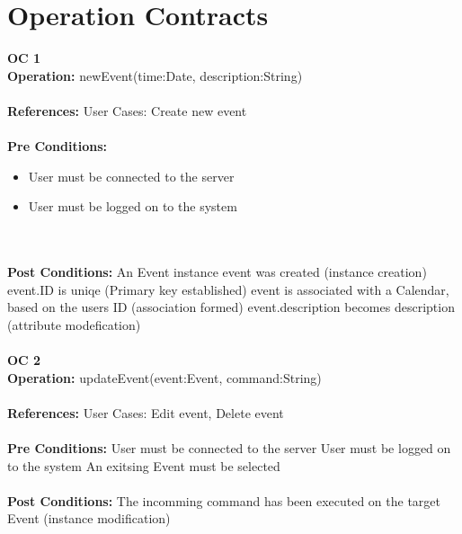 \documentclass[a4paper,10pt,titlepage]{article}
\begin{document}
\section{Operation Contracts}
	\textbf{OC 1} \\
	\textbf{Operation:}	newEvent(time:Date, description:String)
	\\ \\
	\textbf{References:}	User Cases:	Create new event
	\\ \\
	\textbf{Pre Conditions:}
	\begin{itemize}
	\item User must be connected to the server
	\\
	\end{itemize}
	\begin{itemize}
	\item User must be logged on to the system
	\\
	\end{itemize}		
						
					\\ \\
	\textbf{Post Conditions:}	
						An Event instance event was created (instance creation)
						event.ID is uniqe (Primary key established)
						event is associated with a Calendar, based on the users ID (association formed)
						event.description becomes description (attribute modefication)	
					\\ \\	
	\textbf{OC 2} \\
	\textbf{Operation:}	updateEvent(event:Event, command:String)
	\\ \\
	\textbf{References:}	User Cases:	Edit event, Delete event
	\\ \\
	\textbf{Pre Conditions:}
						User must be connected to the server
						User must be logged on to the system
						An exitsing Event must be selected
	\\ \\	
	\textbf{Post Conditions:}
						The incomming command has been executed on the target Event (instance modification)
						
						
\end{document}
